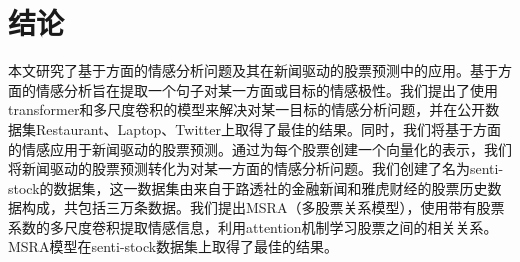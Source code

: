 \chapter{结论}
\label{cha:conclusion}
本文研究了基于方面的情感分析问题及其在新闻驱动的股票预测中的应用。基于方面的情感分析旨在提取一个句子对某一方面或目标的情感极性。我们提出了使用transformer和多尺度卷积的模型来解决对某一目标的情感分析问题，并在公开数据集Restaurant、Laptop、Twitter上取得了最佳的结果。同时，我们将基于方面的情感应用于新闻驱动的股票预测。通过为每个股票创建一个向量化的表示，我们将新闻驱动的股票预测转化为对某一方面的情感分析问题。我们创建了名为senti-stock的数据集，这一数据集由来自于路透社的金融新闻和雅虎财经的股票历史数据构成，共包括三万条数据。我们提出MSRA（多股票关系模型），使用带有股票系数的多尺度卷积提取情感信息，利用attention机制学习股票之间的相关关系。MSRA模型在senti-stock数据集上取得了最佳的结果。
